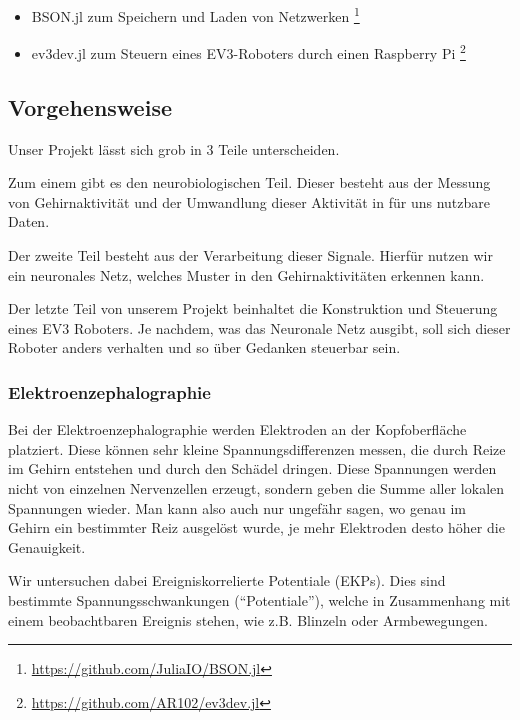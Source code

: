 \documentclass{scrartcl}
\begin{document}
\begin{itemize}
\begin{itemize}
			\item BSON.jl zum Speichern und Laden von Netzwerken
				\footnote{\href{https://github.com/JuliaIO/BSON.jl}{https://github.com/JuliaIO/BSON.jl}}
			
			\item ev3dev.jl zum Steuern eines EV3-Roboters durch einen Raspberry Pi
				\footnote{\href{https://github.com/AR102/ev3dev.jl}{https://github.com/AR102/ev3dev.jl}}
				\cite{ev3dev}
			
		\end{itemize}

	\end{itemize}

	\subsection{Vorgehensweise}

	Unser Projekt lässt sich grob in 3 Teile unterscheiden.

	Zum einem gibt es den neurobiologischen Teil. Dieser besteht aus der Messung von Gehirnaktivität und der Umwandlung dieser Aktivität in für uns nutzbare Daten.
	
	Der zweite Teil besteht aus der Verarbeitung dieser Signale. Hierfür nutzen wir ein neuronales Netz, welches Muster in den Gehirnaktivitäten erkennen kann.
	
	Der letzte Teil von unserem Projekt beinhaltet die Konstruktion und Steuerung eines EV3 Roboters. Je nachdem, was das Neuronale Netz ausgibt, soll sich dieser Roboter anders verhalten und so über Gedanken steuerbar sein.	

	\subsubsection{Elektroenzephalographie}

	Bei der Elektroenzephalographie werden Elektroden an der Kopfoberfläche platziert. Diese können sehr kleine Spannungsdifferenzen messen, die durch Reize im Gehirn entstehen und durch den Schädel dringen. Diese Spannungen werden nicht von einzelnen Nervenzellen erzeugt, sondern geben die Summe aller lokalen Spannungen wieder. Man kann also auch nur ungefähr sagen, wo genau im Gehirn ein bestimmter Reiz ausgelöst wurde, je mehr Elektroden desto höher die Genauigkeit. \cite{wiki:Elektroenzephalografie}

	Wir untersuchen dabei Ereigniskorrelierte Potentiale (EKPs). Dies sind bestimmte Spannungsschwankungen (\enquote{Potentiale}), welche in Zusammenhang mit einem beobachtbaren Ereignis stehen, wie z.B. Blinzeln oder Armbewegungen. \cite{Birbaumer2010} \cite{Praktikum}
\end{document}
